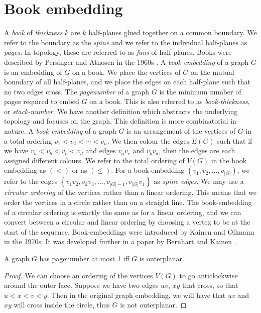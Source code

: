 \section{Book embedding}\label{sec:Book Embedding}
A \textit{book} of \textit{thickness} \(k\) are \(k\) half-planes glued together on a common boundary. We refer to the boundary as the \textit{spine} and we refer to the individual half-planes as \textit{pages}. In topology, these are referred to as \textit{fans} of half-planes. Books were described by Persinger and Atnosen in the 1960s \cite{persingerSubsetsNbooksE31966, atneosenOnedimensionalNleavedContinua1972}.
A \textit{book-embedding} of a graph \(G\) is an embedding of \(G\) on a book. We place the vertices of \(G\) on the mutual boundary of all half-planes, and we place the edges on each half-plane such that no two edges cross.
The \textit{pagenumber} of a graph \(G\) is the minimum number of pages required to embed \(G\) on a book. This is also referred to as \textit{book-thickness}, or \textit{stack-number}.
We have another definition which abstracts the underlying topology and focuses on the graph. This definition is more combinatorial in nature.
A \textit{book embedding} of a graph \(G\) is an arrangement of the vertices of \(G\) in a total ordering \(v_1 < v_2 < \cdots < v_n\). We then colour the edges \(E(G)\) such that if we have \(v_a < v_b < v_c < v_d\) and edges \(v_a v_c\) and \(v_b v_d\), then the edges are each assigned different colours.
We refer to the total ordering of \(V(G)\) in the book embedding as \((<)\) or as \((\leq)\). For a book-embedding \((v_1, v_2, \ldots, v_{|G|})\), we refer to the edges \( \left\{ v_1 v_2, v_2 v_3, \ldots, v_{|G| - 1}, v_{|G|}v_{1} \right\} \) as \textit{spine edges}.
We may use a \textit{circular ordering} of the vertices rather than a linear ordering. This means that we order the vertices in a circle rather than on a straight line. The book-embedding of a circular ordering is exactly the same as for a linear ordering, and we can convert between a circular and linear ordering by choosing a vertex to be at the start of the sequence.
Book-embeddings were introduced by Kainen and Ollmann in the 1970s.\cite{kainenRecentResultsTopological1974, ollmannBookThicknessVarious1973} It was developed further in a paper by Bernhart and Kainen \cite{bernhartBookThicknessGraph1979}.
\begin{lemma}\label{lem:Pagenumber_1}
	A graph \(G\) has pagenumber at most 1 iff \(G\) is outerplanar.
\end{lemma}
\begin{proof}
	We can choose an ordering of the vertices \(V(G)\) to go anticlockwise around the outer face. Suppose we have two edges \(uv\), \(xy\) that cross, so that \(u < x < v < y\). Then in the original graph embedding, we will have that \(uv\) and \(xy\) will cross inside the circle, thus \(G\) is not outerplanar.
\end{proof}
